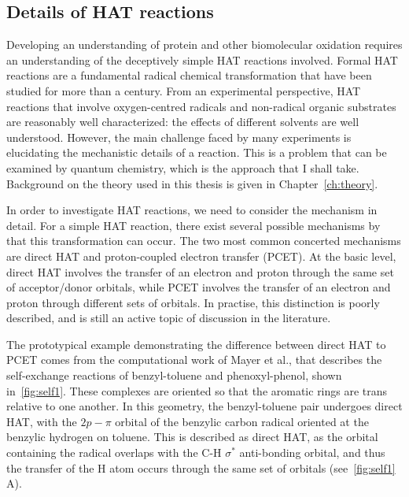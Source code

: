 \begin{doublespace}
\section{Details of HAT reactions}

Developing an understanding of protein and other biomolecular oxidation requires
an understanding of the deceptively simple HAT reactions involved. Formal HAT
reactions are a fundamental radical chemical transformation that have been
studied for more than a century.\cite{Kochi1973, Parsons2000} From an
experimental perspective, HAT reactions that involve oxygen-centred radicals
and non-radical organic substrates are reasonably well characterized: the
effects of different solvents are well understood.\cite{Litwinienko2007}
However, the main challenge faced by many experiments is elucidating the
mechanistic details of a reaction. This is a problem that can be examined by
quantum chemistry, which is the approach that I shall take. Background on the
theory used in this thesis is given in Chapter~\ref{ch:theory}.

In order to investigate HAT reactions, we need to consider the mechanism in
detail. For a simple HAT reaction, there exist several possible mechanisms by
that this transformation can occur. The two most common concerted mechanisms
are direct HAT and proton-coupled electron transfer (PCET). At the basic level,
direct HAT involves the transfer of an electron and proton through the same set
of acceptor/donor orbitals, while PCET involves the transfer of an electron and
proton through different sets of orbitals. In practise, this distinction is
poorly described, and is still an active topic of discussion in the
literature.\cite{Cukier1998, Mayer2002, Stubbe2003, Mayer2004, DiLabio2007,
Huynh2007, HammesSchiffer2008, Mayer2010, Weinberg2012, HammesSchiffer2015,
MunozRugeles2017}

The prototypical example demonstrating the difference between direct HAT to PCET
comes from the computational work of Mayer et al.,\cite{Mayer2002} that
describes the self-exchange reactions of benzyl-toluene and phenoxyl-phenol,
shown in~\ref{fig:self1}. These complexes are oriented so that the aromatic
rings are trans relative to one another. In this geometry, the benzyl-toluene
pair undergoes direct HAT, with the $2p-\pi$ orbital of the benzylic carbon
radical oriented at the benzylic hydrogen on toluene. This is described as
direct HAT, as the orbital containing the radical overlaps with the C-H
$\sigma^*$ anti-bonding orbital, and thus the transfer of the H atom occurs
through the same set of orbitals (see~\ref{fig:self1} A).


\end{doublespace}
